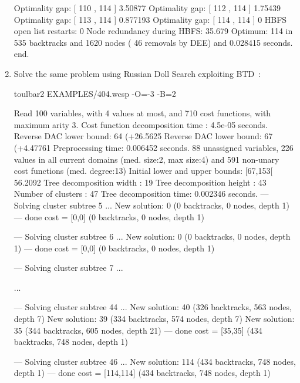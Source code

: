 \begin{enumerate}
{\begin{DoxyCode}
Optimality gap: [ 110 , 114 ] 3.50877 %
Optimality gap: [ 112 , 114 ] 1.75439 %
Optimality gap: [ 113 , 114 ] 0.877193 %
Optimality gap: [ 114 , 114 ] 0 %
HBFS open list restarts: 0 %
Node redundancy during HBFS: 35.679 %
Optimum: 114 in 535 backtracks and 1620 nodes ( 46 removals by DEE) and 0.028415 seconds.
end.
\end{DoxyCode}}
\item Solve the same problem using Russian Doll Search exploiting BTD~\cite{Sanchez09a}:
\begin{DoxyCode}
	toulbar2 EXAMPLES/404.wcsp -O=-3 -B=2
\end{DoxyCode}
{\scriptsize
\begin{DoxyCode}
Read 100 variables, with 4 values at most, and 710 cost functions, with maximum arity 3.
Cost function decomposition time : 4.5e-05 seconds.
Reverse DAC lower bound: 64 (+26.5625%
Reverse DAC lower bound: 67 (+4.47761%
Preprocessing time: 0.006452 seconds.
88 unassigned variables, 226 values in all current domains (med. size:2, max size:4) and 591 non-unary cost functions (med. degree:13)
Initial lower and upper bounds: [67,153[ 56.2092%
Tree decomposition width  : 19
Tree decomposition height : 43
Number of clusters        : 47
Tree decomposition time: 0.002346 seconds.
--- Solving cluster subtree 5 ...
New solution: 0 (0 backtracks, 0 nodes, depth 1)
---  done  cost = [0,0] (0 backtracks, 0 nodes, depth 1)

--- Solving cluster subtree 6 ...
New solution: 0 (0 backtracks, 0 nodes, depth 1)
---  done  cost = [0,0] (0 backtracks, 0 nodes, depth 1)

--- Solving cluster subtree 7 ...

...

--- Solving cluster subtree 44 ...
New solution: 40 (326 backtracks, 563 nodes, depth 7)
New solution: 39 (334 backtracks, 574 nodes, depth 7)
New solution: 35 (344 backtracks, 605 nodes, depth 21)
---  done  cost = [35,35] (434 backtracks, 748 nodes, depth 1)

--- Solving cluster subtree 46 ...
New solution: 114 (434 backtracks, 748 nodes, depth 1)
---  done  cost = [114,114] (434 backtracks, 748 nodes, depth 1)


\end{DoxyCode}}
\end{enumerate}
